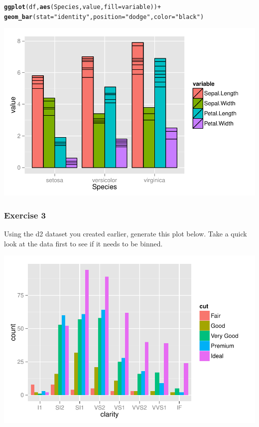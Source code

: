 \documentclass{beamer}\usepackage[]{graphicx}\usepackage[]{color}
\makeatletter
\newcommand{\hlstr}[1]{\textcolor[rgb]{0.192,0.494,0.8}{#1}}%
\newcommand{\hlopt}[1]{\textcolor[rgb]{0,0,0}{#1}}%
\newcommand{\hlstd}[1]{\textcolor[rgb]{0.345,0.345,0.345}{#1}}%
\newcommand{\hlkwc}[1]{\textcolor[rgb]{0.333,0.667,0.333}{#1}}%
\newcommand{\hlkwd}[1]{\textcolor[rgb]{0.737,0.353,0.396}{\textbf{#1}}}%
\newenvironment{kframe}{%
 \def\at@end@of@kframe{}%
 \ifinner\ifhmode%
  \def\at@end@of@kframe{\end{minipage}}%
  \begin{minipage}{\columnwidth}%
 \fi\fi%
 \def\FrameCommand##1{\hskip\@totalleftmargin \hskip-\fboxsep
 \colorbox{shadecolor}{##1}\hskip-\fboxsep
     \hskip-\linewidth \hskip-\@totalleftmargin \hskip\columnwidth}%
 \MakeFramed {\advance\hsize-\width
   \@totalleftmargin\z@ \linewidth\hsize
   \@setminipage}}%
 {\par\unskip\endMakeFramed%
 \at@end@of@kframe}
\newenvironment{knitrout}{}{} %
\makeatother
\begin{document}
\begin{frame}[fragile]
\begin{knitrout}\footnotesize
{}\color{fgcolor}\begin{kframe}
\begin{alltt}
\hlkwd{ggplot}\hlstd{(df,} \hlkwd{aes}\hlstd{(Species, value,} \hlkwc{fill} \hlstd{= variable))} \hlopt{+}
\hlkwd{geom_bar}\hlstd{(}\hlkwc{stat} \hlstd{=} \hlstr{"identity"}\hlstd{,} \hlkwc{position}\hlstd{=}\hlstr{"dodge"}\hlstd{,} \hlkwc{color}\hlstd{=}\hlstr{"black"}\hlstd{)}
\end{alltt}
\end{kframe}

{\centering \includegraphics[width=.75\linewidth]{figure/barthree2} 

}



\end{knitrout}
\end{frame}


\begin{frame}[fragile]
\frametitle{Exercise 3}
Using the d2 dataset you created earlier, generate this plot below. Take a quick look at the data first to see if it needs to be binned.
\begin{knitrout}\footnotesize
{}\color{fgcolor}

{\centering \includegraphics[width=.75\linewidth]{figure/ex3} 

}



\end{knitrout}
\end{frame}
\end{document}
